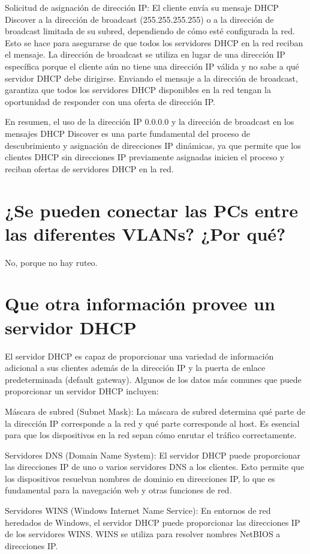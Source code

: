 	Solicitud de asignación de dirección IP: El cliente envía su mensaje DHCP Discover a la dirección de broadcast (255.255.255.255) o a la dirección de broadcast limitada de su subred, dependiendo de cómo esté configurada la red. Esto se hace para asegurarse de que todos los servidores DHCP en la red reciban el mensaje. La dirección de broadcast se utiliza en lugar de una dirección IP específica porque el cliente aún no tiene una dirección IP válida y no sabe a qué servidor DHCP debe dirigirse. Enviando el mensaje a la dirección de broadcast, garantiza que todos los servidores DHCP disponibles en la red tengan la oportunidad de responder con una oferta de dirección IP.
	
	En resumen, el uso de la dirección IP 0.0.0.0 y la dirección de broadcast en los mensajes DHCP Discover es una parte fundamental del proceso de descubrimiento y asignación de direcciones IP dinámicas, ya que permite que los clientes DHCP sin direcciones IP previamente asignadas inicien el proceso y reciban ofertas de servidores DHCP en la red.
	\section{¿Se pueden conectar las PCs entre las diferentes VLANs? ¿Por qué?}

	No, porque no hay ruteo.
	\section{Que otra información provee un servidor DHCP}
	El servidor DHCP es capaz de proporcionar una variedad de información adicional a sus clientes además de la dirección IP y la puerta de enlace predeterminada (default gateway). Algunos de los datos más comunes que puede proporcionar un servidor DHCP incluyen:
	
	Máscara de subred (Subnet Mask): La máscara de subred determina qué parte de la dirección IP corresponde a la red y qué parte corresponde al host. Es esencial para que los dispositivos en la red sepan cómo enrutar el tráfico correctamente.
	
	Servidores DNS (Domain Name System): El servidor DHCP puede proporcionar las direcciones IP de uno o varios servidores DNS a los clientes. Esto permite que los dispositivos resuelvan nombres de dominio en direcciones IP, lo que es fundamental para la navegación web y otras funciones de red.
	
	Servidores WINS (Windows Internet Name Service): En entornos de red heredados de Windows, el servidor DHCP puede proporcionar las direcciones IP de los servidores WINS. WINS se utiliza para resolver nombres NetBIOS a direcciones IP.
	
